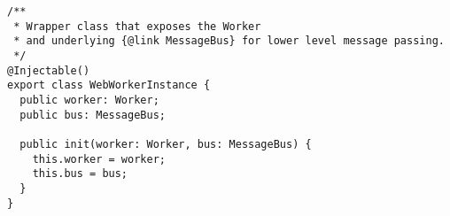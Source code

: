 \begin{verbatim}
/**
 * Wrapper class that exposes the Worker
 * and underlying {@link MessageBus} for lower level message passing.
 */
@Injectable()
export class WebWorkerInstance {
  public worker: Worker;
  public bus: MessageBus;

  public init(worker: Worker, bus: MessageBus) {
    this.worker = worker;
    this.bus = bus;
  }
}
\end{verbatim}
